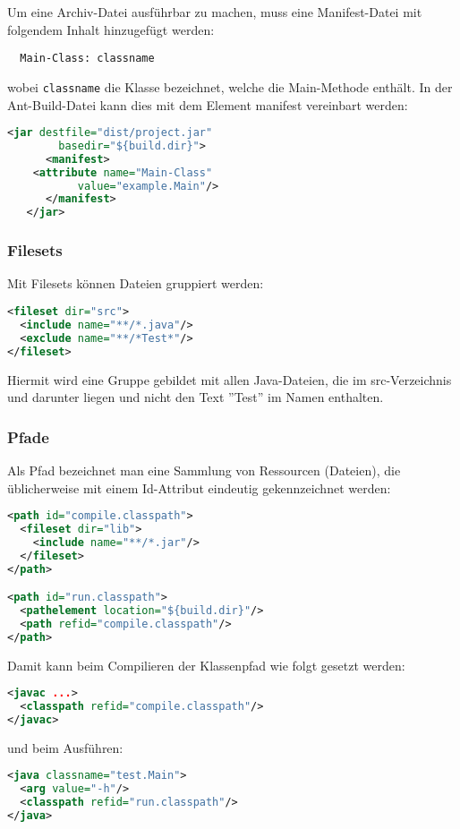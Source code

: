 \newslide
Um eine Archiv-Datei ausführbar zu machen, muss eine Manifest-Datei
mit folgendem Inhalt hinzugefügt werden:
\begin{verbatim}
  Main-Class: classname
\end{verbatim}
wobei \verb+classname+ die Klasse bezeichnet, welche die Main-Methode
enthält. In der Ant-Build-Datei kann dies mit dem Element manifest
vereinbart werden:
\begin{lstlisting}[language=xml,morekeywords={jar,manifest,attribute}]
   <jar destfile="dist/project.jar"
        basedir="${build.dir}">
      <manifest>
	<attribute name="Main-Class"
		   value="example.Main"/>
      </manifest>
   </jar>
\end{lstlisting}
\newslide
\subsubsection{Filesets}
Mit Filesets können Dateien gruppiert werden:
\begin{lstlisting}[language=xml,morekeywords={fileset,include,exclude}]
<fileset dir="src">
  <include name="**/*.java"/>
  <exclude name="**/*Test*"/>
</fileset>
\end{lstlisting}
Hiermit wird eine Gruppe gebildet mit allen Java-Dateien, die im
src-Verzeichnis und darunter liegen und nicht den Text ''Test'' im
Namen enthalten.
%
\newslide
\subsubsection{Pfade}
Als Pfad bezeichnet man eine Sammlung von Ressourcen (Dateien), die
üblicherweise mit einem Id-Attribut eindeutig gekennzeichnet werden:
\begin{lstlisting}[language=xml,morekeywords={path,pathelement,fileset,include}]
<path id="compile.classpath">
  <fileset dir="lib">
    <include name="**/*.jar"/>
  </fileset>
</path>

<path id="run.classpath">
  <pathelement location="${build.dir}"/>
  <path refid="compile.classpath"/>
</path>
\end{lstlisting}
\newslide
Damit kann beim Compilieren der Klassenpfad wie folgt gesetzt werden:
\begin{lstlisting}[language=xml,morekeywords={javac,classpath}]
<javac ...>
  <classpath refid="compile.classpath"/>
</javac>
\end{lstlisting}
und beim Ausführen:
\begin{lstlisting}[language=xml,morekeywords={java,arg,classpath}]
<java classname="test.Main">
  <arg value="-h"/>
  <classpath refid="run.classpath"/>
</java>
\end{lstlisting}
%
\newslide
